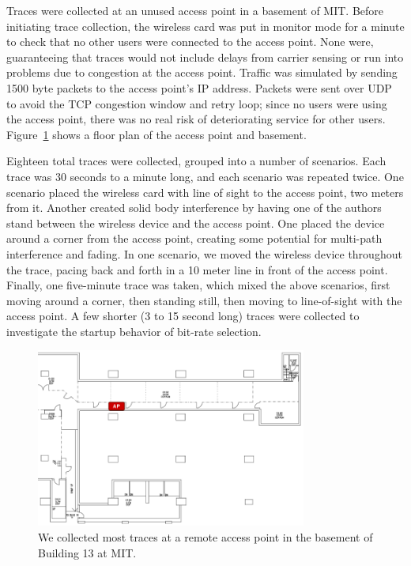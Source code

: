 \documentclass[letterpaper,twocolumn,10pt]{article}
\begin{document}
Traces were collected at an unused access point in a basement of MIT.  Before initiating trace collection, the wireless card was put in monitor mode for a minute to check that no other users were connected to the access point.  None were, guaranteeing that traces would not include delays from carrier sensing or run into problems due to congestion at the access point.  Traffic was simulated by sending 1500 byte packets to the access point's IP address.  Packets were sent over UDP to avoid the TCP congestion window and retry loop; since no users were using the access point, there was no real risk of deteriorating service for other users.  Figure~\ref{figure:1} shows a floor plan of the access point and basement.

Eighteen total traces were collected, grouped into a number of scenarios.  Each trace was 30 seconds to a minute long, and each scenario was repeated twice.  One scenario placed the wireless card with line of sight to the access point, two meters from it.  Another created solid body interference by having one of the authors stand between the wireless device and the access point.  One placed the device around a corner from the access point, creating some potential for multi-path interference and fading.  In one scenario, we moved the wireless device throughout the trace, pacing back and forth in a 10 meter line in front of the access point.  Finally, one five-minute trace was taken, which mixed the above scenarios, first moving around a corner, then standing still, then moving to line-of-sight with the access point.  A few shorter (3 to 15 second long) traces were collected to investigate the startup behavior of bit-rate selection.

\begin{figure}[hbt]
  \centering
  \includegraphics[width=3.5in]{bsmt13floorplan.png}
  \caption{We collected most traces at a remote access point in the basement of Building 13 at MIT.}
\label{figure:1}
\end{figure}
\end{document}
